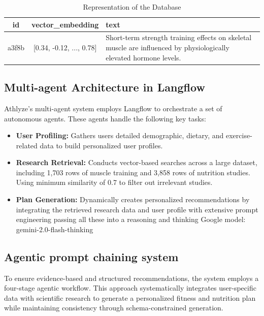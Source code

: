 \documentclass[conference]{IEEEtran}
\begin{document}
\begin{table}[h]
    \caption{Representation of the Database}
    \centering
    \small %
    \begin{tabular}{|c|c|p{2.4cm}|}
        \hline
        \textbf{id} & \textbf{vector\_embedding} &  \textbf{text} \\
        \hline
        a3f8b & [0.34, -0.12, ..., 0.78] & Short-term strength training effects on skeletal muscle are influenced by physiologically elevated hormone levels. \\
        \hline
    \end{tabular}
\end{table}

\subsection{Multi-agent Architecture in Langflow}
Athlyze's multi-agent system employs Langflow \cite{6} to orchestrate a set of autonomous agents. These agents handle the following key tasks:

\begin{itemize}
    \item \textbf{User Profiling:} Gathers users detailed demographic, dietary, and exercise-related data to build personalized user profiles.
    \item \textbf{Research Retrieval:} Conducts vector-based searches across a large dataset, including 1,703 rows of muscle training and 3,858 rows of nutrition studies. Using minimum similarity of 0.7 to filter out irrelevant studies.
    \item \textbf{Plan Generation:} Dynamically creates personalized recommendations by integrating the retrieved research data and user profile with extensive prompt engineering passing all these into a reasoning and thinking Google model: gemini-2.0-flash-thinking
\end{itemize}

\subsection{Agentic prompt chaining system}
To ensure evidence-based and structured recommendations, the system employs a four-stage agentic workflow. This approach systematically integrates user-specific data with scientific research to generate a personalized fitness and nutrition plan while maintaining consistency through schema-constrained generation.
\end{document}
